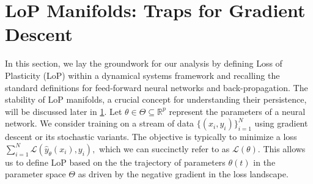 \documentclass{article}
\newcommand{\Loss}{\mathcal{L}}
\newcommand{\R}{\mathbb{R}}
\numberwithin{figure}{section}
\begin{document}
\section{LoP Manifolds: Traps for Gradient Descent}
\label{sec:existence_lop_manifold}
\label{sec:preliminaries}
In this section, we lay the groundwork for our analysis by defining Loss of Plasticity (LoP) within a dynamical systems framework and recalling the standard definitions for feed-forward neural networks and back-propagation. The stability of LoP manifolds, a crucial concept for understanding their persistence, will be discussed later in \cref{sec:existence_lop_manifold}.
Let $\theta\in\Theta\subseteq\R^p$ represent the parameters of a neural network. We consider training on a stream of data $\{(x_i,y_i)\}_{i=1}^N$ using gradient descent or its stochastic variants. The objective is typically to minimize a loss $\sum_{i=1}^N \Loss(\hat{y}_\theta(x_i),y_i),$ which we can succinctly refer to as $\Loss(\theta)$. This allows us to define LoP based on the the trajectory of parameters $\theta(t)$ in the parameter space $\Theta$ as driven by the negative gradient in the loss landscape.

\end{document}
